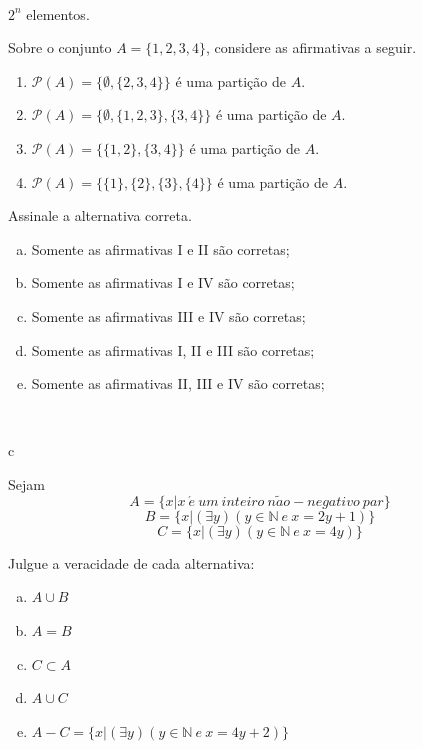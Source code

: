 \documentclass[a4paper, 12pt, addpoints]{exam}
\begin{document}
\begin{questions}
\begin{resp}~

    $2^n$ elementos.
\end{resp}


\question Sobre o conjunto $A = \{1, 2, 3, 4\}$, considere as afirmativas a seguir.

\begin{enumerate}
    \item $\mathcal{P}(A) = \{\emptyset, \{2, 3, 4\}\}$ é uma partição de $A$.
    \item $\mathcal{P}(A) = \{\emptyset, \{1, 2, 3\}, \{3, 4\}\}$ é uma partição de $A$.
    \item $\mathcal{P}(A) = \{\{1, 2\}, \{3, 4\}\}$ é uma partição de $A$.
    \item $\mathcal{P}(A) = \{\{1\}, \{2\}, \{3\}, \{4\}\}$ é uma partição de $A$.
\end{enumerate}



\noindent
Assinale a alternativa correta.

\begin{enumerate}[a)]
    \item Somente as afirmativas I e II são corretas;
    \item Somente as afirmativas I e IV são corretas;
    \item Somente as afirmativas III e IV são corretas;
    \item Somente as afirmativas I, II e III são corretas;
    \item Somente as afirmativas II, III e IV são corretas;
\end{enumerate}

\begin{resp}~
    
    c
\end{resp}

\question Sejam
\[ A = \{x | x ~ \acute{e} ~ um ~ inteiro ~ n\tilde{a}o - negativo ~ par \} \]
\[ B = \{x | (\exists y) (y \in \mathbb{N} ~ e ~ x = 2y + 1 )\} \]
\[ C = \{x|(\exists y)(y \in \mathbb{N} ~ e ~ x = 4y)\} \]

Julgue a veracidade de cada alternativa:

\begin{enumerate}[a)]
    \item $A \cup B$
    \item $A = B$
    \item $ C \subset A$
    \item $A \cup C$
    \item $A - C = \{x|(\exists y)(y \in \mathbb{N} ~ e ~ x = 4y + 2)\}$
\end{enumerate}


\end{questions}
\end{document}
